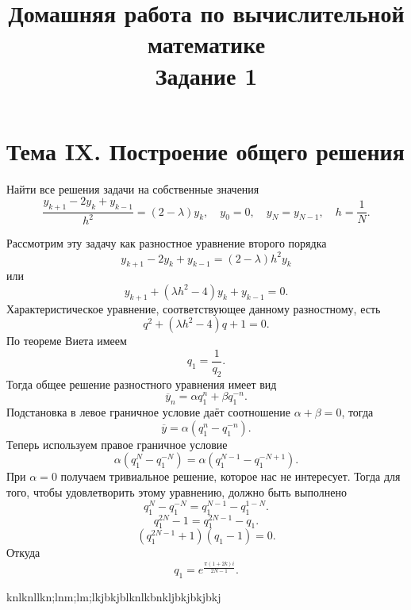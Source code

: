 \documentclass[a4paper]{article}
\title{Домашняя работа по вычислительной математике\\
Задание 1}
\begin{document}
	\maketitle
	\section*{Тема IX. Построение общего решения}	
\begin{hiProb}[7.19]
	Найти все решения задачи на собственные значения
	\[
		\frac{y_{k+1} -2 y_k +y_{k-1}}{h^2}=(2-\lambda)
		y_k,\quad y_0=0,\quad y_N=y_{N-1},\quad
		h=\frac{1}{N}
	.\] 

\end{hiProb}
\begin{sol}
Рассмотрим эту задачу как разностное уравнение второго порядка
\[
	y_{k+1}-2y_k+ y_{k-1}=(2-\lambda)h^2 y_k
\]
или
\[
	y_{k+1}+(\lambda h^2 -4)y_k +y_{k-1}=0
.\] 
Характеристическое уравнение, соответствующее данному разностному,
есть
\[
	q^2 +(\lambda h^2 -4) q+1=0
.\] 
По теореме Виета имеем
\[
q_1= \frac{1}{q_2}
.\] 
Тогда общее решение разностного уравнения имеет вид
\[
\overline{y}_n= \alpha q_1^n +\beta q_1^{-n}
.\] 
Подстановка в левое граничное условие даёт соотношение
$\alpha+\beta=0$, тогда
\[
	\overline{y}= \alpha\left(  q_1^n-q_1^{-n} \right) 
.\] 
Теперь используем правое граничное условие
\[
	\alpha\left( q_1^N-q_1^{-N} \right) =
	\alpha\left( q_{1}^{N-1}-q_1^{-N+1} \right) 
.\] 
При $\alpha=0$ получаем тривиальное решение, которое нас не 
интересует. Тогда для того, чтобы удовлетворить этому уравнению,
должно быть выполнено \[q_1^{N}-q_1^{-N}=q_1^{N-1}-q_1^{1-N}.\]
\[
q_1^{2N}-1=q_1^{2N-1}-q_1
.\] 
\[
	(q_1^{2N-1}+1)(q_1-1)=0
.\] 
Откуда
\[
	q_1=e^{\frac{\pi(1+2k)i}{2N-1}}
.\] 
\end{sol}
knlknllkn;lnm;lm;lkjbkjblknlkbnkljbkjbkjbkj
\end{document}
